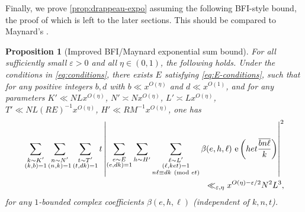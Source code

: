 \documentclass[reqno,11pt]{amsart}
\newtheorem{proposition}[theorem]{Proposition}
\theoremstyle{definition}
\theoremstyle{remark}
\numberwithin{equation}{section}
\newcommand{\e}{\textnormal{e}}
\newcommand{\eps}{\varepsilon}
\renewcommand{\bar}{\overline}
\renewcommand{\pmod}[1]{\ (\textnormal{mod } #1)}
\begin{document}
Finally, we prove \cref{prop:drappeau-expo} assuming the following BFI-style bound, the proof of which is left to the later sections. This should be compared to Maynard's \cite[Lemma 18.5]{maynard2020primes}.


\begin{proposition}[Improved BFI/Maynard exponential sum bound] \label{prop:bfi-expo}
For all sufficiently small $\eps > 0$ and all $\eta \in (0, 1)$, the following holds. Under the conditions in \cref{eq:conditions}, there exists $E$ satisfying \cref{eq:E-conditions}, such that for any positive integers $b, d$ with $b \ll x^{O(\eta)}$ and $d \ll x^{O(1)}$, and for any parameters $K' \ll NL x^{O(\eta)}$, $N' \asymp N x^{O(\eta)}$, $L' \asymp L x^{O(\eta)}$, $T' \ll NL(RE)^{-1} x^{O(\eta)}$, $H' \ll R M^{-1} x^{O(\eta)}$, one has
\begin{equation} \label{eq:bfi-expo}
\begin{aligned}
    \sum_{\substack{k \sim K' \\ (k, b) = 1}} 
    \sum_{\substack{n \sim N' \\ (n, k) = 1}} 
    \sum_{\substack{t \sim T' \\ (t, dk) = 1}} t \left\vert
    \sum_{\substack{e \sim E \\ (e, dk) = 1}}
    \sum_{h \sim H'} 
    \sum_{\substack{\ell \sim L' \\ (\ell, ket) = 1 \\ n \ell \equiv d k \pmod{et}}} 
    \beta(e, h, \ell)\ \e\left(het \frac{\bar{b n \ell}}{k}\right)
    \right\vert^2
    \\
    \ll_{\eps, \eta} x^{O(\eta) - \eps/2} N^2 L^3,
\end{aligned}
\end{equation}
for any $1$-bounded complex coefficients $\beta(e, h, \ell)$ (independent of $k, n, t$). %
\end{proposition}
\end{document}
